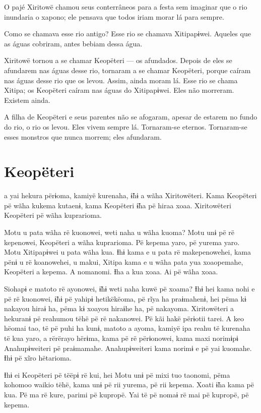 O pajé Xiritowë chamou seus conterrâneos para a festa sem imaginar que o
rio inundaria o xapono; ele pensava que todos iriam morar lá para
sempre. 

Como se chamava esse rio {antigo}? Esse rio se chamava
Xitipapɨwei. Aqueles que as águas cobriram, antes bebiam dessa água. 

Xiritowë tornou a se chamar Keopëteri --- os afundados. Depois de eles se
afundarem nas águas desse rio, tornaram a se chamar Keopëteri, porque
caíram nas águas desse rio que os levou. Assim, ainda moram lá. Esse rio
se chama Xitipa; os Keopëteri caíram nas águas do Xitipapɨwei. Eles não
morreram. Existem ainda. 

A filha de Keopëteri e seus parentes não se afogaram, apesar de estarem
no fundo do rio, o rio os levou. Eles vivem sempre lá. Tornaram-se
eternos. Tornaram-se esses monstros que nunca morrem; eles afundaram.

\chapter{Keopëteri}

 a yai hekura përɨoma, kamiyë kurenaha, ɨ̃hɨ a wãha
Xiritowëteri. Kama Keopëteri pë wãha kukema kutaenɨ, kama Keopëteri ɨ̃ha
pë hiraa xoaa. Xiritowëteri Keopëteri pë wãha kuprarioma.

Motu u pata wãha rë kuonowei, weti naha u wãha kuoma? Motu unɨ pë rë
kepenowei, Keopëteri a wãha kuprarioma. Pë kepema yaro, pë yurema yaro.
Motu Xitipapɨwei u pata wãha kua. Ɨhɨ kama e u pata rë makepenowehei,
kama pënɨ u rë koanowehei, u makui, Xitipa kama e u wãha pata yua
xoaopemahe, Keopëteri a kepema. A nomanomi. Ɨha a kua xoaa. Ai pë wãha
xoaa. 

Siohapɨ e matoto rë ayonowei, ɨ̃hɨ weti naha kuwë pë xoama? Ɨhɨ hei kama
nohi e pë rë kuonowei, ɨ̃hɨ pë yahipɨ hetikëkëoma, pë rĩya ha praɨmahenɨ,
hei pëma kɨ nakayou hiraɨ ha, pëma kɨ xoayou hiraɨhe ha, pë nakayoma.
Xiritowëteri a hekuranɨ pë reahumou tëhë pë rë nakanowei. Pë kãi hakë
përɨotii tarei. A keo hëomai tao, të pë puhi ha kunɨ, matoto a ayoma,
kamiyë ipa reahu të kurenaha të kua yaro, a rërërayo hërɨma, kama pë rë
përɨonowei, kama maxi norimɨpɨ Anahupɨweiteri pë praɨmamahe.
Anahupɨweiteri kama norimɨ e pë yai kuomahe. Ɨhɨ pë xĩro hëtarioma. 

Ɨhɨ ei Keopëteri pë tëëpɨ rë kui, hei Motu unɨ pë mixi tuo taonomi, pëma
kohomoo waikio tëhë, kama unɨ pë rii yurema, pë rii kepema. Xoati ɨ̃ha
kama pë kua. Pë ma rë kure, parimi pë kupropë. Yai të pë nomaɨ rë mai pë
kupropë, pë kepema. 

